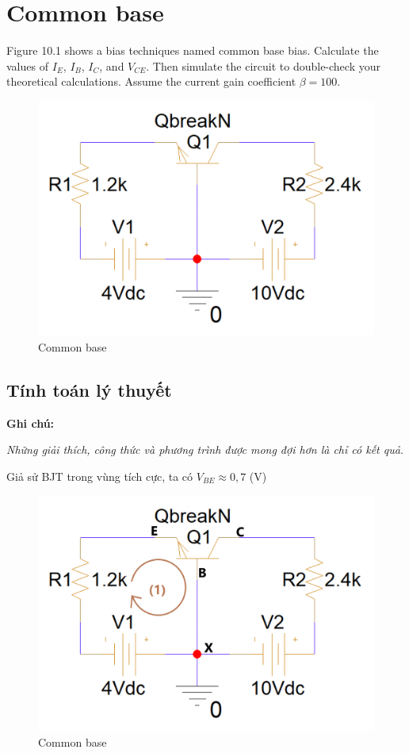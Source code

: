 \section{Common base}
Figure 10.1 shows a bias techniques named common base bias.
Calculate the values of \(I_E\), \(I_B\), \(I_C\), and \(V_{CE}\). Then simulate the circuit to double-check your theoretical calculations.
Assume the current gain coefficient \(\beta = 100\).

\begin{figure}[ht]
    \centering
    \includegraphics[scale=0.3]{graphics/ex10/f1.png}
    \caption{Common base}
\end{figure}
\subsection{Tính toán lý thuyết}
\textbf{Ghi chú:}

\textit{Những giải thích, công thức và phương trình được mong đợi hơn là chỉ có kết quả.}

Giả sử BJT trong vùng tích cực, ta có \(V_{BE} \approx 0,7\) (V)

\begin{figure}[ht]
    \centering
    \includegraphics[scale=0.3]{graphics/ex10/f2.png}
    \caption{Common base}
\end{figure}

